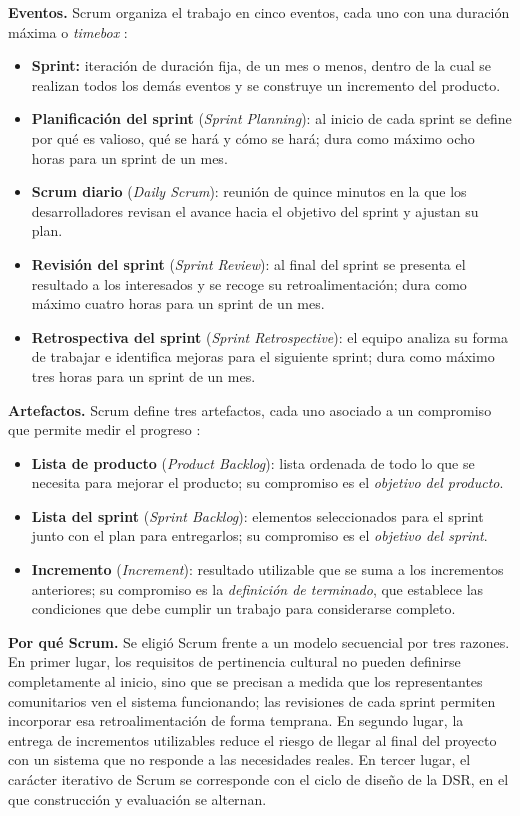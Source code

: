 \textbf{Eventos.} Scrum organiza el trabajo en cinco eventos, cada uno con una duración máxima o \textit{timebox} \cite{schwaber2020scrum}:

\begin{itemize}
  \item \textbf{Sprint:} iteración de duración fija, de un mes o menos, dentro de la cual se realizan todos los demás eventos y se construye un incremento del producto.
  \item \textbf{Planificación del sprint} (\textit{Sprint Planning}): al inicio de cada sprint se define por qué es valioso, qué se hará y cómo se hará; dura como máximo ocho horas para un sprint de un mes.
  \item \textbf{Scrum diario} (\textit{Daily Scrum}): reunión de quince minutos en la que los desarrolladores revisan el avance hacia el objetivo del sprint y ajustan su plan.
  \item \textbf{Revisión del sprint} (\textit{Sprint Review}): al final del sprint se presenta el resultado a los interesados y se recoge su retroalimentación; dura como máximo cuatro horas para un sprint de un mes.
  \item \textbf{Retrospectiva del sprint} (\textit{Sprint Retrospective}): el equipo analiza su forma de trabajar e identifica mejoras para el siguiente sprint; dura como máximo tres horas para un sprint de un mes.
\end{itemize}

\textbf{Artefactos.} Scrum define tres artefactos, cada uno asociado a un compromiso que permite medir el progreso \cite{schwaber2020scrum}:

\begin{itemize}
  \item \textbf{Lista de producto} (\textit{Product Backlog}): lista ordenada de todo lo que se necesita para mejorar el producto; su compromiso es el \textit{objetivo del producto}.
  \item \textbf{Lista del sprint} (\textit{Sprint Backlog}): elementos seleccionados para el sprint junto con el plan para entregarlos; su compromiso es el \textit{objetivo del sprint}.
  \item \textbf{Incremento} (\textit{Increment}): resultado utilizable que se suma a los incrementos anteriores; su compromiso es la \textit{definición de terminado}, que establece las condiciones que debe cumplir un trabajo para considerarse completo.
\end{itemize}

\textbf{Por qué Scrum.} Se eligió Scrum frente a un modelo secuencial por tres razones. En primer lugar, los requisitos de pertinencia cultural no pueden definirse completamente al inicio, sino que se precisan a medida que los representantes comunitarios ven el sistema funcionando; las revisiones de cada sprint permiten incorporar esa retroalimentación de forma temprana. En segundo lugar, la entrega de incrementos utilizables reduce el riesgo de llegar al final del proyecto con un sistema que no responde a las necesidades reales. En tercer lugar, el carácter iterativo de Scrum se corresponde con el ciclo de diseño de la DSR, en el que construcción y evaluación se alternan.

